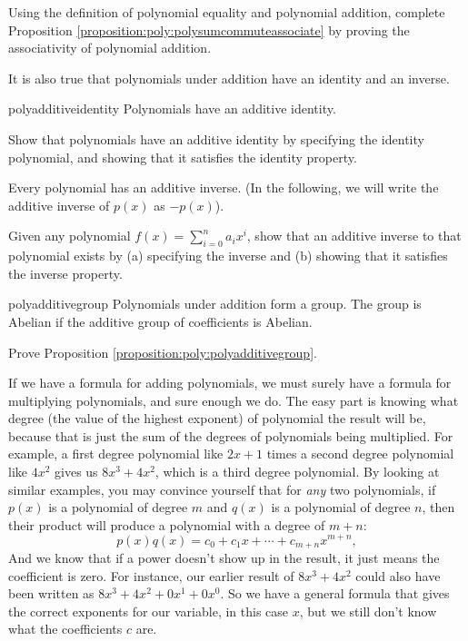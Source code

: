 \begin {exercise}{}
Using the definition of polynomial equality and polynomial addition, complete Proposition \ref{proposition:poly:polysumcommuteassociate} by proving the associativity of polynomial addition.
\end {exercise}

It is also true that polynomials under addition have an identity and an inverse.

\begin {prop}{polyadditiveidentity} Polynomials have an additive identity.
\end{prop}
\begin{exercise}
Show that polynomials have an additive identity by specifying the identity polynomial, and showing that it satisfies the identity property.
\end{exercise}

\begin{prop}\label{proposition:poly:polyadditiveinverse} Every polynomial has an additive inverse.  (In the following, we will write the additive inverse of $p(x)$ as $-p(x)$).
\end{prop}
\begin{exercise}
Given any polynomial $f(x) = \sum_{i=0}^{n} a_i x^i$, show that an additive inverse to that polynomial exists by (a) specifying the inverse and (b) showing that it satisfies the inverse property.
\end{exercise}

\begin {prop}{polyadditivegroup} Polynomials under addition form a group. The group is Abelian if the additive group of coefficients is Abelian.
\end{prop}

\begin{exercise}
Prove Proposition \ref{proposition:poly:polyadditivegroup}.
\end{exercise}

If we have a formula for adding polynomials, we must surely have a formula for multiplying polynomials, and sure enough we do.  The easy part is knowing what degree (the value of the highest exponent) of polynomial the result will be, because that is just the sum of the degrees of polynomials being multiplied. For example, a first degree polynomial like $2x+1$ times a second degree polynomial like $4x^2$ gives us $8x^3+4x^2$, which is a third degree polynomial.  By looking at similar examples, you may convince yourself that for \emph{any} two polynomials, if $p(x)$ is a polynomial of degree $m$ and $q(x)$ is a polynomial of degree $n$, then their product will produce a polynomial with a degree of $m+n$:
\[
p(x) q(x) = c_0 + c_1 x + \cdots + c_{m + n} x^{m + n},
\]
And we know that if a power doesn't show up in the result, it just means the coefficient is zero.  For instance, our earlier result of $8x^3+4x^2$ could also have been written as $8x^3+4x^2 + 0x^1 + 0x^0$.  So we have a general formula that gives the correct exponents for our variable, in this case $x$, but we still don't know what the coefficients $c$ are.
 

